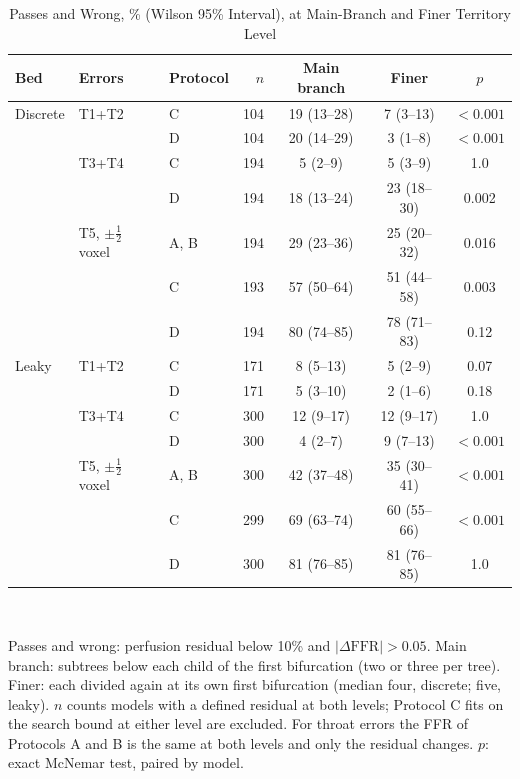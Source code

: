 \documentclass[journal,twoside,web,onecolumn]{ieeecolor}
\begin{document}
\begin{table}[!ht]
\caption{Passes and Wrong, \% (Wilson 95\% Interval), at Main-Branch and Finer Territory Level}\label{tab:gran}
\centering\footnotesize
\begin{tabular}{@{}lllrccc@{}}
\toprule
Bed & Errors & Protocol & $n$ & Main branch & Finer & $p$\\
\midrule
Discrete & T1+T2 & C & 104 & 19 (13--28) & 7 (3--13) & $<0.001$ \\
 & & D & 104 & 20 (14--29) & 3 (1--8) & $<0.001$ \\
 & T3+T4 & C & 194 & 5 (2--9) & 5 (3--9) & 1.0 \\
 & & D & 194 & 18 (13--24) & 23 (18--30) & 0.002 \\
 & T5, $\pm\tfrac12$ voxel & A, B & 194 & 29 (23--36) & 25 (20--32) & 0.016 \\
 & & C & 193 & 57 (50--64) & 51 (44--58) & 0.003 \\
 & & D & 194 & 80 (74--85) & 78 (71--83) & 0.12 \\
\addlinespace[2pt]
Leaky & T1+T2 & C & 171 & 8 (5--13) & 5 (2--9) & 0.07 \\
 & & D & 171 & 5 (3--10) & 2 (1--6) & 0.18 \\
 & T3+T4 & C & 300 & 12 (9--17) & 12 (9--17) & 1.0 \\
 & & D & 300 & 4 (2--7) & 9 (7--13) & $<0.001$ \\
 & T5, $\pm\tfrac12$ voxel & A, B & 300 & 42 (37--48) & 35 (30--41) & $<0.001$ \\
 & & C & 299 & 69 (63--74) & 60 (55--66) & $<0.001$ \\
 & & D & 300 & 81 (76--85) & 81 (76--85) & 1.0 \\
\bottomrule
\end{tabular}
\\[3pt]
\parbox{0.85\textwidth}{\footnotesize Passes and wrong: perfusion residual below 10\% and $|\Delta\mathrm{FFR}| > 0.05$. Main branch: subtrees below each child of the first bifurcation (two or three per tree). Finer: each divided again at its own first bifurcation (median four, discrete; five, leaky). $n$ counts models with a defined residual at both levels; Protocol C fits on the search bound at either level are excluded. For throat errors the FFR of Protocols A and B is the same at both levels and only the residual changes. $p$: exact McNemar test, paired by model.}
\end{table}

\FloatBarrier
{}
\end{document}
